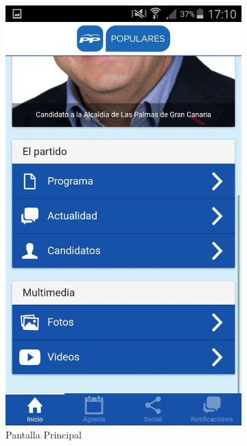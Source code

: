 \begin{figure}[H]
        \centering
        \begin{subfigure}[b]{0.3\textwidth}
                \includegraphics[width=\textwidth]{Media/Captures/ppCanarias.jpg}
                \caption{Pantalla Principal}
                \label{fig:ppIndex}
        \end{subfigure}
        ~
        \begin{subfigure}[b]{0.3\textwidth}

\end{subfigure}
\end{figure}
